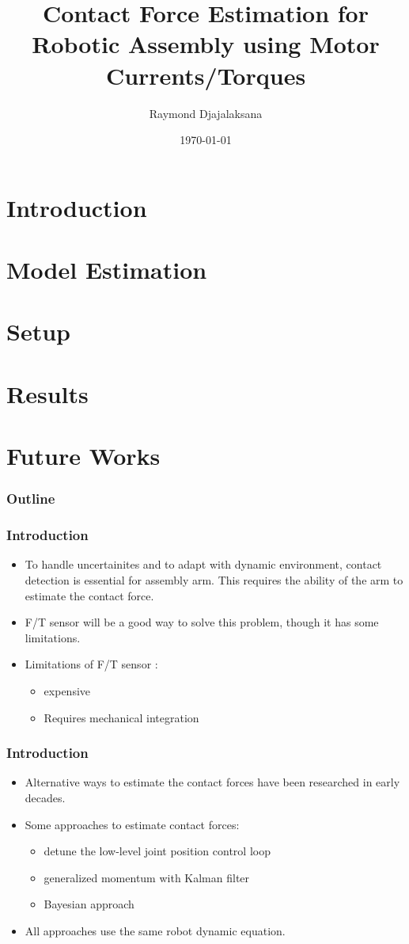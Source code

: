 \documentclass[12pt,english]{beamer}
\title{Contact Force Estimation for Robotic Assembly using Motor Currents/Torques}
\author{Raymond Djajalaksana}
\date{\today}
\begin{document}
  \frame{\titlepage}
  
  \section{Introduction}
  \section{Model Estimation}
  \section{Setup}
  \section{Results}
  \section{Future Works} 
  \begin{frame}
    \frametitle{Outline}
    \tableofcontents
  \end{frame}
  
  \begin{frame}
    \frametitle{Introduction}
    \begin{itemize}
      \item To handle uncertainites and to adapt with dynamic environment, contact detection is essential for assembly arm. This requires the ability of the arm to estimate the contact force.
      \item F/T sensor will be a good way to solve this problem, though it has some limitations.
      \item Limitations of F/T sensor :
      \begin{itemize}
        \item expensive
        \item Requires mechanical integration
      \end{itemize}
    \end{itemize}
  \end{frame}
  
  \begin{frame}
    \frametitle{Introduction}
    \begin{itemize}
      \item Alternative ways to estimate the contact forces have been researched in early decades.
      \item Some approaches to estimate contact forces:
      \begin{itemize}
        \item detune the low-level joint position control loop
        \item generalized momentum with Kalman filter
        \item Bayesian approach
      \end{itemize}
      \item All approaches use the same robot dynamic equation.
    \end{itemize}
  \end{frame}
  
\end{document}
